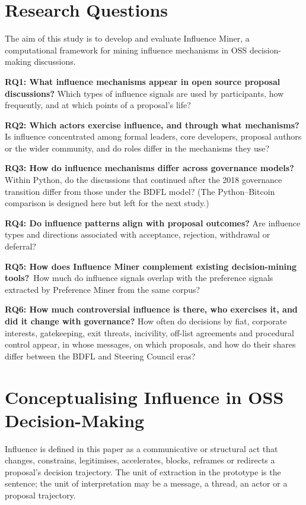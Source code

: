 \documentclass[sigconf,screen]{acmart}
\begin{document}
\section{Research Questions}

The aim of this study is to develop and evaluate Influence Miner, a computational framework for mining influence mechanisms in OSS decision-making discussions.

\textbf{RQ1: What influence mechanisms appear in open source proposal discussions?} Which types of influence signals are used by participants, how frequently, and at which points of a proposal's life?

\textbf{RQ2: Which actors exercise influence, and through what mechanisms?} Is influence concentrated among formal leaders, core developers, proposal authors or the wider community, and do roles differ in the mechanisms they use?

\textbf{RQ3: How do influence mechanisms differ across governance models?} Within Python, do the discussions that continued after the 2018 governance transition differ from those under the BDFL model? (The Python--Bitcoin comparison is designed here but left for the next study.)

\textbf{RQ4: Do influence patterns align with proposal outcomes?} Are influence types and directions associated with acceptance, rejection, withdrawal or deferral?

\textbf{RQ5: How does Influence Miner complement existing decision-mining tools?}\  How much do influence signals overlap with the preference signals extracted by Preference Miner from the same corpus?

\textbf{RQ6: How much controversial influence is there, who exercises it, and did it change with governance?} How often do decisions by fiat, corporate interests, gatekeeping, exit threats, incivility, off-list agreements and procedural control appear, in whose messages, on which proposals, and how do their shares differ between the BDFL and Steering Council eras?

\section{Conceptualising Influence in OSS Decision-Making}
\label{sec:taxonomy}

Influence is defined in this paper as a communicative or structural act that changes, constrains, legitimises, accelerates, blocks, reframes or redirects a proposal's decision trajectory. The unit of extraction in the prototype is the sentence; the unit of interpretation may be a message, a thread, an actor or a proposal trajectory.
\end{document}
